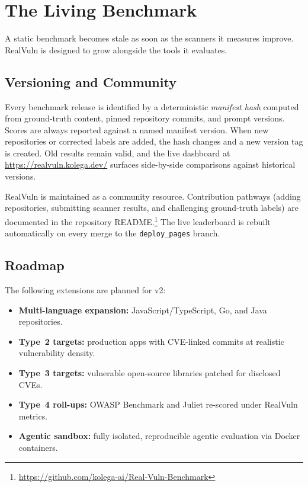 \section{The Living Benchmark}
\label{sec:living-benchmark}

A static benchmark becomes stale as soon as the scanners it measures improve.
RealVuln is designed to grow alongside the tools it evaluates.

\subsection{Versioning and Community}

Every benchmark release is identified by a deterministic \emph{manifest hash} computed from ground-truth content, pinned repository commits, and prompt versions. Scores are always reported against a named manifest version. When new repositories or corrected labels are added, the hash changes and a new version tag is created. Old results remain valid, and the live dashboard at \url{https://realvuln.kolega.dev/} surfaces side-by-side comparisons against historical versions.

RealVuln is maintained as a community resource. Contribution pathways (adding repositories, submitting scanner results, and challenging ground-truth labels) are documented in the repository README.\footnote{\url{https://github.com/kolega-ai/Real-Vuln-Benchmark}} The live leaderboard is rebuilt automatically on every merge to the \texttt{deploy\_pages} branch.

\subsection{Roadmap}

The following extensions are planned for v2:
\begin{itemize}
  \item \textbf{Multi-language expansion:} JavaScript/TypeScript, Go, and Java repositories.
  \item \textbf{Type~2 targets:} production apps with CVE-linked commits at realistic vulnerability density.
  \item \textbf{Type~3 targets:} vulnerable open-source libraries patched for disclosed CVEs.
  \item \textbf{Type~4 roll-ups:} OWASP Benchmark and Juliet re-scored under RealVuln metrics.
  \item \textbf{Agentic sandbox:} fully isolated, reproducible agentic evaluation via Docker containers.
\end{itemize}
